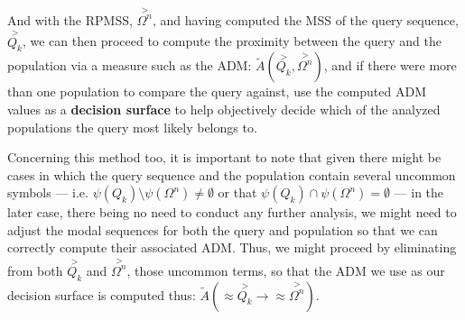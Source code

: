 \documentclass[a4paper, 18pt]{book} %
\begin{document}
And with the RPMSS, $\overset{>}{\Omega^n}$, and having computed the MSS of the query sequence, $\overset{>}{Q_k}$, we can then proceed to compute the proximity between the query and the population via a measure such as the ADM: $\tilde{A}(\overset{>}{Q_k},\overset{>}{\Omega^n})$, and if there were more than one population to compare the query against, use the computed ADM values as a \textbf{decision surface} to help objectively decide which of the analyzed populations the query most likely belongs to.

Concerning this method too, it is important to note that given there might be cases in which the query sequence and the population contain several uncommon symbols --- i.e. $\psi(Q_k) \setminus \psi(\Omega^n) \neq \emptyset$ or that $\psi(Q_k) \cap \psi(\Omega^n) = \emptyset$ --- in the later case, there being no need to conduct any further analysis, we might need to adjust the modal sequences for both the query and population so that we can correctly compute their associated ADM. Thus, we might proceed by eliminating from both $\overset{>}{Q_k}$ and $\overset{>}{\Omega^n}$, those uncommon terms, so that the ADM we use as our decision surface is computed thus: $\tilde{A}(\approx\overset{>}{Q_k} \rightarrow \approx\overset{>}{\Omega^n})$.\\
\end{document}
